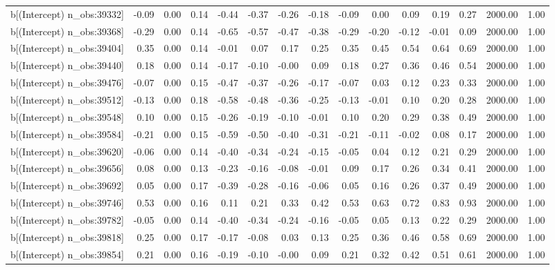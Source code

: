 \begin{table}[ht]
\begin{tabular}{rrrrrrrrrrrrrrr}
  b[(Intercept) n\_obs:39332] & -0.09 & 0.00 & 0.14 & -0.44 & -0.37 & -0.26 & -0.18 & -0.09 & 0.00 & 0.09 & 0.19 & 0.27 & 2000.00 & 1.00 \\ 
  b[(Intercept) n\_obs:39368] & -0.29 & 0.00 & 0.14 & -0.65 & -0.57 & -0.47 & -0.38 & -0.29 & -0.20 & -0.12 & -0.01 & 0.09 & 2000.00 & 1.00 \\ 
  b[(Intercept) n\_obs:39404] & 0.35 & 0.00 & 0.14 & -0.01 & 0.07 & 0.17 & 0.25 & 0.35 & 0.45 & 0.54 & 0.64 & 0.69 & 2000.00 & 1.00 \\ 
  b[(Intercept) n\_obs:39440] & 0.18 & 0.00 & 0.14 & -0.17 & -0.10 & -0.00 & 0.09 & 0.18 & 0.27 & 0.36 & 0.46 & 0.54 & 2000.00 & 1.00 \\ 
  b[(Intercept) n\_obs:39476] & -0.07 & 0.00 & 0.15 & -0.47 & -0.37 & -0.26 & -0.17 & -0.07 & 0.03 & 0.12 & 0.23 & 0.33 & 2000.00 & 1.00 \\ 
  b[(Intercept) n\_obs:39512] & -0.13 & 0.00 & 0.18 & -0.58 & -0.48 & -0.36 & -0.25 & -0.13 & -0.01 & 0.10 & 0.20 & 0.28 & 2000.00 & 1.00 \\ 
  b[(Intercept) n\_obs:39548] & 0.10 & 0.00 & 0.15 & -0.26 & -0.19 & -0.10 & -0.01 & 0.10 & 0.20 & 0.29 & 0.38 & 0.49 & 2000.00 & 1.00 \\ 
  b[(Intercept) n\_obs:39584] & -0.21 & 0.00 & 0.15 & -0.59 & -0.50 & -0.40 & -0.31 & -0.21 & -0.11 & -0.02 & 0.08 & 0.17 & 2000.00 & 1.00 \\ 
  b[(Intercept) n\_obs:39620] & -0.06 & 0.00 & 0.14 & -0.40 & -0.34 & -0.24 & -0.15 & -0.05 & 0.04 & 0.12 & 0.21 & 0.29 & 2000.00 & 1.00 \\ 
  b[(Intercept) n\_obs:39656] & 0.08 & 0.00 & 0.13 & -0.23 & -0.16 & -0.08 & -0.01 & 0.09 & 0.17 & 0.26 & 0.34 & 0.41 & 2000.00 & 1.00 \\ 
  b[(Intercept) n\_obs:39692] & 0.05 & 0.00 & 0.17 & -0.39 & -0.28 & -0.16 & -0.06 & 0.05 & 0.16 & 0.26 & 0.37 & 0.49 & 2000.00 & 1.00 \\ 
  b[(Intercept) n\_obs:39746] & 0.53 & 0.00 & 0.16 & 0.11 & 0.21 & 0.33 & 0.42 & 0.53 & 0.63 & 0.72 & 0.83 & 0.93 & 2000.00 & 1.00 \\ 
  b[(Intercept) n\_obs:39782] & -0.05 & 0.00 & 0.14 & -0.40 & -0.34 & -0.24 & -0.16 & -0.05 & 0.05 & 0.13 & 0.22 & 0.29 & 2000.00 & 1.00 \\ 
  b[(Intercept) n\_obs:39818] & 0.25 & 0.00 & 0.17 & -0.17 & -0.08 & 0.03 & 0.13 & 0.25 & 0.36 & 0.46 & 0.58 & 0.69 & 2000.00 & 1.00 \\ 
  b[(Intercept) n\_obs:39854] & 0.21 & 0.00 & 0.16 & -0.19 & -0.10 & -0.00 & 0.09 & 0.21 & 0.32 & 0.42 & 0.51 & 0.61 & 2000.00 & 1.00 \\ 

\end{tabular}
\end{table}
